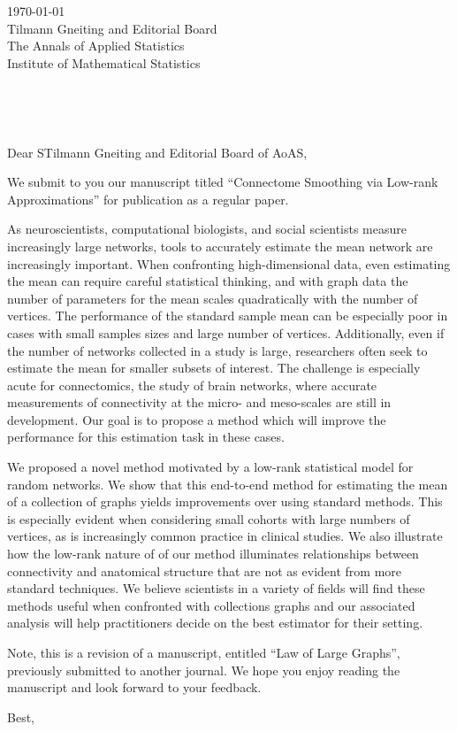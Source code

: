 \documentclass[11pt]{letter} %
\def\opening#1{\thispagestyle{empty}
{\centering\fromaddress \vspace{0.75in} \\ %
} %
{\raggedright \toname \\ \toaddress \par} %
\vspace{0.3in} %
\noindent #1 %
}
\begin{document}
\begin{letter}{%
\today\\
\vspace{11pt}
Tilmann Gneiting and Editorial Board \\
The Annals of Applied Statistics\\
Institute of Mathematical Statistics
}


\opening{Dear STilmann Gneiting and Editorial Board of AoAS,}

We submit to you our manuscript titled ``Connectome Smoothing via Low-rank Approximations'' for publication as a regular paper.

As neuroscientists, computational biologists, and social scientists measure increasingly large networks, tools to accurately estimate the mean network are increasingly important.
When confronting high-dimensional data, even estimating the mean can require careful statistical thinking, and with graph data the number of parameters for the mean scales quadratically with the number of vertices.
The performance of the standard sample mean can be especially poor in cases with small samples sizes and large number of vertices.
Additionally, even if the number of networks collected in a study is large, researchers often seek to estimate the mean for smaller subsets of interest.
The challenge is especially acute for connectomics, the study of brain networks, where accurate measurements of connectivity at the micro- and meso-scales are still in development.
Our goal is to propose a method which will improve the performance for this estimation task in these cases.

We proposed a novel method motivated by a low-rank statistical model for random networks.
We show that this end-to-end method for estimating the mean of a collection of graphs yields improvements over using standard methods.
This is especially evident when considering small cohorts with large numbers of vertices, as is increasingly common practice in clinical studies.
We also illustrate how the low-rank nature of of our method illuminates relationships between connectivity and anatomical structure that are not as evident from more standard techniques.
We believe scientists in a variety of fields will find these methods useful when confronted with collections graphs and our associated analysis will help practitioners decide on the best estimator for their setting.

Note, this is a revision of a manuscript, entitled ``Law of Large Graphs'', previously submitted to another journal.
We hope you enjoy reading the manuscript and look forward to your feedback.

\closing{Best,}


\end{letter}
\end{document}
